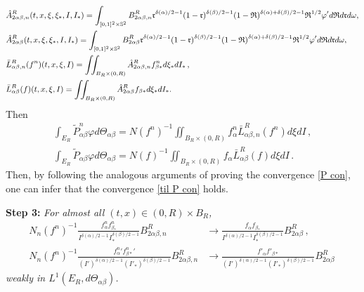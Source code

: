 \documentclass[reqno,11pt]{amsart}
\numberwithin{equation}{section}
\begin{document}
\begin{equation*}{\small
	\begin{aligned}
&\hat{A}^R_{2\alpha \beta, n } (t,x,\xi,\xi_*,I,I_*) =\int_{[0,1]^2 \times \mathbb{S}^2 } B^R_{2\alpha \beta, n} \mathfrak{r}^{\delta (\alpha)/2-1} (1- \mathfrak{r})^{\delta(\beta)/2-1} (1-\mathfrak{R})^{\delta(\alpha)+\delta(\beta)/2-1} \mathfrak{R}^{1/2}\varphi' d \mathfrak{R} d \mathfrak{r} d\omega,\\
&\hat{A}^R_{2\alpha \beta } (t,x,\xi,\xi_*,I,I_*) =\int_{[0,1]^2 \times \mathbb{S}^2 } B^R_{2\alpha \beta } \mathfrak{r}^{\delta (\alpha)/2-1} (1-\mathfrak{r})^{\delta(\beta)/2-1} (1-\mathfrak{R})^{\delta(\alpha)+\delta(\beta)/2-1} \mathfrak{R}^{1/2}\varphi' d \mathfrak{R} d \mathfrak{r}d\omega,\\
&  \bar{L} ^R_{ \alpha \beta, n}(f^n)(t,x,\xi,I) =   \iint_{B_R\times(0,R)} \hat{A}^R_{2\alpha \beta, n } f^n_{\beta *} d \xi_* d I_* \,, \\
& \bar{L}^R_{ \alpha \beta }(f)(t,x,\xi,I) = \iint_{B_R\times(0,R)} \hat{A}^R_{2\alpha \beta } f_{\beta *}d\xi_* dI_*.
\end{aligned}}
\end{equation*}
Then
  \begin{align*}
    \int_{E_R}  \tilde{P}^n_{\alpha \beta}\varphi d \Theta_{\alpha \beta} = N (f^n)^{-1} \iint_{B_R \times (0,R)} f^n_\alpha  \bar{L} ^R_{ \alpha \beta, n}(f^n)  d\xi dI \,, \\
    \int_{E_R}  \tilde{P}_{\alpha \beta}\varphi d \Theta_{\alpha \beta} = N (f)^{-1} \iint_{B_R \times (0,R)} f_\alpha \bar{L}^R_{ \alpha \beta }(f) d\xi dI \,.
  \end{align*}
Then, by following the analogous arguments of proving the convergence \eqref{P con}, one can infer that the convergence \eqref{til P con} holds.


{\bf Step 3:} {\em For almost all $(t,x)\in (0,R)\times B_R$,
	\begin{equation}\label{cnv-fn'*}
	\begin{aligned} 
		N_n  (f^n)^{-1} \tfrac{f^n_\alpha f^n_{\beta_* }}{I^{\delta(\alpha)/2-1} I_* ^{\delta(\beta)/2-1}} B^R_{2 \alpha \beta, n} &\rightarrow  \tfrac{f_\alpha f_{\beta_* }}{I^{\delta(\alpha)/2-1} I_* ^{\delta(\beta)/2-1}} B^R_{2 \alpha \beta} \,, \\
		  N_n (f^n)^{-1} \tfrac{ {f_\alpha^n}' {f_{\beta *}^n}' }{(I')^{\delta(\alpha)/2-1} (I'_* )^{\delta(\beta)/2-1}} B^R_{2 \alpha \beta, n}& \rightarrow \tfrac{ {f'_\alpha} f'_{\beta *} }{(I')^{\delta(\alpha)/2-1} (I'_* )^{\delta(\beta)/2-1}} B^R_{2 \alpha \beta} \,
		  \end{aligned}
	\end{equation}
	weakly in $ L^1(E_R, d \Theta_{\alpha \beta})$.}
\end{document}
